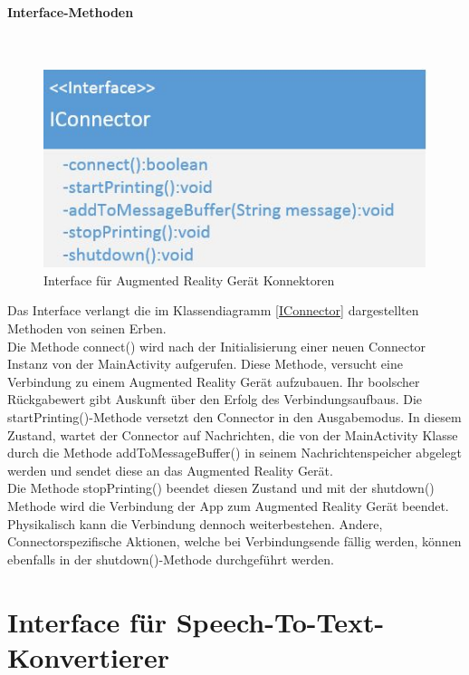 \paragraph{Interface-Methoden}\\
\begin{figure}
	\includegraphics[width=\linewidth]{../images/iconnector.jpg}
	\caption{Interface für Augmented Reality Gerät Konnektoren}
	\label{fig:IConnector}
\end{figure}
Das Interface verlangt die im Klassendiagramm \ref{IConnector} dargestellten Methoden von seinen Erben.\\
Die Methode connect() wird nach der Initialisierung einer neuen Connector Instanz von der MainActivity aufgerufen. Diese Methode, versucht eine Verbindung zu einem Augmented Reality Gerät aufzubauen. Ihr boolscher Rückgabewert gibt Auskunft über den Erfolg des Verbindungsaufbaus.
Die startPrinting()-Methode versetzt den Connector in den Ausgabemodus. In diesem Zustand, wartet der Connector auf Nachrichten, die von der MainActivity Klasse durch die Methode addToMessageBuffer() in seinem Nachrichtenspeicher abgelegt werden und sendet diese an das Augmented Reality Gerät.\\
Die Methode stopPrinting() beendet diesen Zustand und mit der shutdown() Methode wird die Verbindung der App zum Augmented Reality Gerät beendet. Physikalisch kann die Verbindung dennoch weiterbestehen. Andere, Connectorspezifische Aktionen, welche bei Verbindungsende fällig werden, können ebenfalls in der shutdown()-Methode durchgeführt werden.
\section{Interface für Speech-To-Text-Konvertierer}
